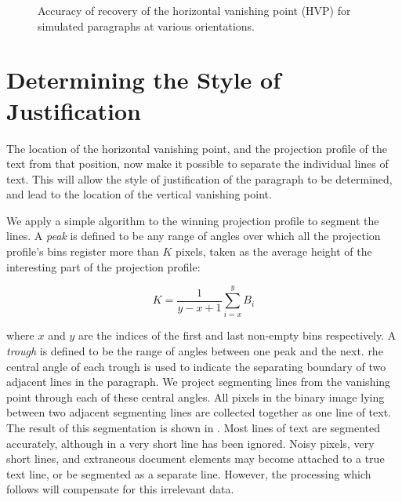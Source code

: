 \begin{figure}[t]
\centering
\begin{center}
\end{center}
\vspace*{-6mm}
\caption{Accuracy of recovery of the horizontal vanishing point (HVP) for simulated paragraphs at various orientations.}
\label{hvpaccuracy}
\end{figure}






\section{Determining the Style of Justification} \label{sec-vertvanish}

The location of the horizontal vanishing point, and the projection profile
of the text from that position, now make it possible to
separate the individual lines of text.
This will allow the style of justification of the paragraph to be determined,
and lead to the location of the vertical vanishing point.

We apply a simple algorithm to the winning projection profile to segment the lines.  A {\em peak} is
defined to be any range of angles over which all the projection profile's bins register more than $K$
pixels, taken as the average height of the interesting part of the projection profile:

\begin{equation}
K= \frac{1}{y-x+1} \sum_{i=x}^{y}B_i
\end{equation}

{\parindent 0mm
where $x$ and $y$ are the indices of the first and last non-empty bins respectively.
A {\em trough} is defined to be the range of angles between one peak and the next.  
rhe central angle of each trough is used to indicate the separating boundary of
two adjacent lines in the paragraph.  We project segmenting lines from the
vanishing point through each of these central angles.
All pixels in the binary image lying between two adjacent segmenting
lines are collected together as one line of text.  The result of this
segmentation is shown in .  Most lines of
text are segmented accurately, although in  a very short line has been ignored.  Noisy pixels, very short lines, and extraneous document elements may become attached to a true text line, or be segmented as a separate line.  However, the processing which follows will compensate for this irrelevant data.
}


